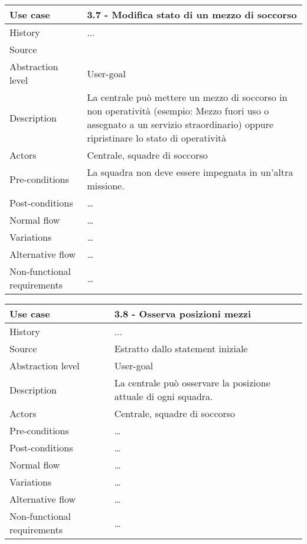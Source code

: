\documentclass{article}
\begin{document}
    \begin{table}
        \begin{tabularx}{\textwidth}{l|X}
            Use case & 3.7 - Modifica stato di un mezzo di soccorso \\
            \hline
            History & ...                                     \\
            Source &  \\
            Abstraction level & User-goal \\
            Description & La centrale può mettere un mezzo di soccorso in non operatività (esempio: Mezzo fuori uso o assegnato a un servizio straordinario) oppure ripristinare lo stato di operatività \\
            Actors & Centrale, squadre di soccorso \\
            Pre-conditions & La squadra non deve essere impegnata in un’altra missione. \\
            Post-conditions & \dots \\
            Normal flow & \dots \\
            Variations & \dots \\
            Alternative flow & \dots \\
            Non-functional requirements & \dots
        \end{tabularx}
        \label{tab:usecase3.7}
    \end{table}

    \begin{table}
        \begin{tabularx}{\textwidth}{l|X}
            Use case & 3.8 - Osserva posizioni mezzi \\
            \hline
            History & ...                                     \\
            Source & Estratto dallo statement iniziale \\
            Abstraction level & User-goal \\
            Description & La centrale può osservare la posizione attuale di ogni squadra. \\
            Actors & Centrale, squadre di soccorso \\
            Pre-conditions & \dots \\
            Post-conditions & \dots \\
            Normal flow & \dots \\
            Variations & \dots \\
            Alternative flow & \dots \\
            Non-functional requirements & \dots
        \end{tabularx}
        \label{tab:usecase3.8}
    \end{table}
\end{document}
